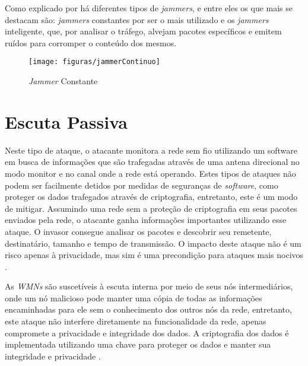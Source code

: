 \par Como explicado por  há diferentes tipos de \emph{jammers}, e entre eles os que mais se destacam s\~ao: \emph{jammers} constantes por ser o mais utilizado e os \emph{jammers} inteligente, que, por analisar o tráfego, alvejam pacotes específicos e emitem ruídos para corromper o conteúdo dos mesmos.

\begin{figure}[ht]
	\caption{\emph{Jammer} Constante}
	\centering
		\texttt{[image: figuras/jammerContinuo]}
\end{figure}

\section{Escuta Passiva}
\label{sec:2sniffing}
\par Neste tipo de ataque, o atacante monitora a rede sem fio utilizando um software em busca de informações que são trafegadas através de uma antena direcional no modo monitor e no canal onde a rede est\'a operando. Estes tipos de ataques não podem ser facilmente detidos por medidas de seguranças de \emph{software}, como proteger os dados trafegados através de criptografia, entretanto, este \'e um modo de mitigar. Assumindo uma rede sem a proteção de criptografia em seus pacotes enviados pela rede, o atacante ganha informações importantes utilizando esse ataque. O invasor consegue analisar os pacotes e descobrir seu remetente, destinatário, tamanho e tempo de transmissão. O impacto deste ataque não é um risco apenas à privacidade, mas sim é uma precondição para ataques mais nocivos \cite{welch2003a} \cite{yuan2008}.

\par As \emph{WMNs} s\~ao suscetíveis à escuta interna por meio de seus n\'os intermediários, onde um n\'o malicioso pode manter uma cópia de todas as informações encaminhadas para ele sem o conhecimento dos outros n\'os da rede, entretanto, este ataque não interfere diretamente na funcionalidade da rede, apenas compromete a privacidade e integridade dos dados. A criptografia dos dados é implementada utilizando uma chave para proteger os dados e manter sua integridade e privacidade \cite{sen2013}.

